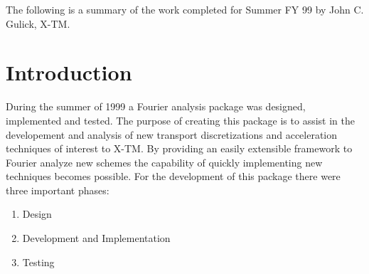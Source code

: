 \documentclass[11pt]{rnote}
\begin{document}

\subject{Summary of Completed Work for John C. Gulick}

\date{August 27, 1999}



\distribution {}


\opening

\noindent
The following is a summary of the work completed for Summer FY 99 by
John C. Gulick, X-TM.
\section{Introduction}
\noindent
During the summer of 1999 a Fourier analysis package was designed,
implemented and tested.  The purpose of creating this package is to assist in
the developement and analysis of new transport discretizations and
acceleration techniques of interest to X-TM.  By providing an easily
extensible framework to Fourier analyze new schemes the capability of
quickly implementing new techniques becomes possible.  For the development of this
package there were three important phases:
\begin{enumerate}
 \item Design
 \item Development and Implementation
 \item Testing
\end{enumerate}
\end{document}
